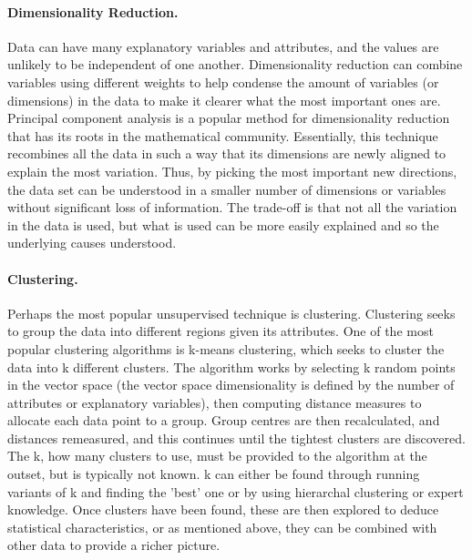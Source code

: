 \paragraph{Dimensionality Reduction.} Data can have many explanatory variables and attributes, and the values are unlikely to be independent of one another. Dimensionality reduction can combine variables using different weights to help condense the amount of variables (or dimensions) in the data to make it clearer what the most important ones are. Principal component analysis is a popular method for dimensionality reduction that has its roots in the mathematical community. Essentially, this technique recombines all the data in such a way that its dimensions are newly aligned to explain the most variation. Thus, by picking the most important new directions, the data set can be understood in a smaller number of dimensions or variables without significant loss of information. The trade-off is that not all the variation in the data is used, but what is used can be more easily explained and so the underlying causes understood.


\paragraph{Clustering.} Perhaps the most popular unsupervised technique is clustering. Clustering seeks to group the data into different regions given its attributes. One of the most popular clustering algorithms is k-means clustering, which seeks to cluster the data into k different clusters. The algorithm works by selecting k random points in the vector space (the vector space dimensionality is defined by the number of attributes or explanatory variables), then computing distance measures to allocate each data point to a group. Group centres are then recalculated, and distances remeasured, and this continues until the tightest clusters are discovered. The k, how many clusters to use, must be provided to the algorithm at the outset, but is typically not known. k can either be found through running variants of k and finding the ’best’ one or by using hierarchal clustering or expert knowledge. Once clusters have been found, these are then explored to deduce statistical characteristics, or as mentioned above, they can be combined with other data to provide a richer picture.


